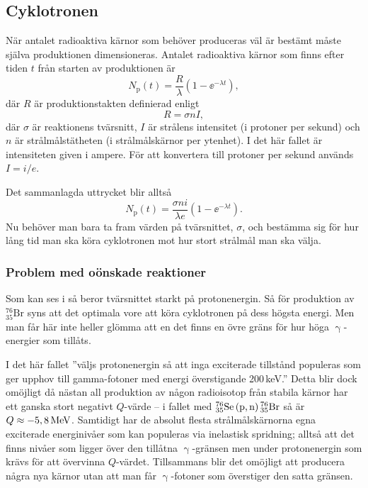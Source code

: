 \documentclass[11pt,a4paper, german, english, swedish
]{article}
\newcommand{\G}{\ifmmode\upgamma\else$\upgamma$\fi}
\newcommand{\Thalv}{\ifmmode{T_{\nicefrac{1}{2}}}\else$T_{\nicefrac{1}{2}}$\fi}
\begin{document}
\subsection{Cyklotronen}
När antalet radioaktiva kärnor som behöver produceras väl är bestämt måste själva produktionen dimensioneras. Antalet radioaktiva kärnor som finns efter tiden $t$ från starten av produktionen är
\begin{equation}
N_\text{p}(t) = \frac{R}{\lambda} \left( 1-\ee^{-\lambda t} \right),
\end{equation}
där $R$ är produktionstakten definierad enligt
\begin{equation}
R=\sigma n I,
\end{equation}
där $\sigma$ är reaktionens tvärsnitt, $I$ är strålens intensitet (i protoner per sekund) och $n$ är strålmålstätheten (i strålmålskärnor per ytenhet). I det här fallet är intensiteten given i ampere. För att konvertera till protoner per sekund används $I=i/e$. 

Det sammanlagda uttrycket blir alltså
\begin{equation}\label{eq:N_p}
N_\text{p}(t) = \frac{\sigma n i}{\lambda e} \left( 1-\ee^{-\lambda t} \right).
\end{equation}
Nu behöver man bara ta fram värden på tvärsnittet, $\sigma$, och bestämma sig för hur lång tid man ska köra cyklotronen mot hur stort strålmål man ska välja. 

\subsubsection{Problem med oönskade reaktioner}
Som kan ses i  så beror tvärsnittet starkt på protonenergin. Så för produktion av $^{76}_{35}\mathrm{Br}$ syns att det optimala vore att köra cyklotronen på dess högsta energi. Men man får här inte heller glömma att en det finns en övre gräns för hur höga \G-energier som tillåts. 

I det här fallet ''väljs protonenergin så att inga exciterade tillstånd populeras som ger upphov till gamma-fotoner med energi överstigande 200\,keV.'' Detta blir dock omöjligt då nästan all produktion av någon radioisotop från stabila kärnor har ett ganska stort negativt $Q$-värde -- i fallet med $^{76}_{35}\mathrm{Se}\,(\text{p,\,n})\,^{76}_{35}\mathrm{Br}$ så är $Q\approx\unit[-5,8]{MeV}$. Samtidigt har de absolut flesta strålmålskärnorna egna exciterade energinivåer som kan populeras via inelastisk spridning; alltså att det finns nivåer som ligger över den tillåtna \G-gränsen men under protonenergin som krävs för att övervinna $Q$-värdet. Tillsammans blir det omöjligt att producera några nya kärnor utan att man får \G-fotoner som överstiger den satta gränsen.
\end{document}

